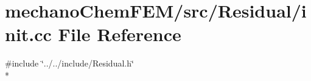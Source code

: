 \section{mechano\-Chem\-F\-E\-M/src/\-Residual/init.cc File Reference}
\label{init_8cc}
{\ttfamily \#include \char`\"{}../../include/\-Residual.\-h\char`\"{}}\\*
